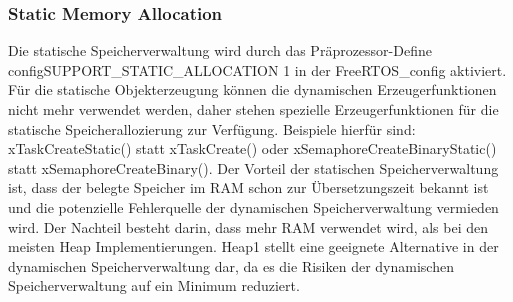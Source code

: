 \subsubsection{Static Memory Allocation}
Die statische Speicherverwaltung wird durch das Prä\-pro\-zes\-sor-Define configSUPPORT\_STATIC\_ALLOCATION 1 in der FreeRTOS\_config aktiviert. Für die statische Objekterzeugung können die dynamischen Erzeugerfunktionen nicht mehr verwendet werden, daher stehen spezielle Erzeugerfunktionen für die statische Speicherallozierung zur Verfügung. Beispiele hierfür sind: xTaskCreateStatic() statt xTaskCreate() oder xSemaphoreCreateBinaryStatic() statt xSemaphoreCreateBinary(). Der Vorteil der statischen Speicherverwaltung ist, dass der belegte Speicher im RAM schon zur Übersetzungszeit bekannt ist und die potenzielle Fehlerquelle der dynamischen Speicherverwaltung vermieden wird. Der Nachteil besteht darin, dass mehr RAM verwendet wird, als bei den meisten Heap Implementierungen. Heap1 stellt eine geeignete Alternative in der dynamischen Speicherverwaltung dar, da es die Risiken der dynamischen Speicherverwaltung auf ein Minimum reduziert.   